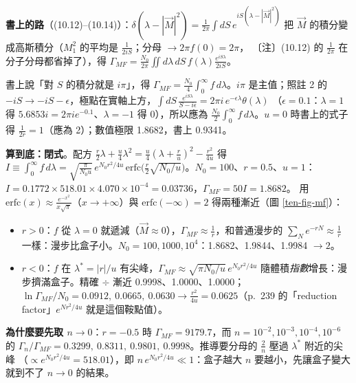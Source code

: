 \textbf{書上的路}（(10.12)--(10.14)）：$\delta(\lambda-|\vec M|^2)=\frac1{2\pi}\int dS\,e^{iS(\lambda-|\vec M|^2)}$ 把 $\vec M$ 的積分變成高斯積分（$M_1^2$ 的平均是 $\frac1{2iS}$；分母 $\to2\pi f(0)=2\pi$，
〔注〕(10.12) 的 $\frac1{2\pi}$ 在分子分母都省掉了），得 $\Gamma_{MF}=\frac{N_0}{2\pi}\iint d\lambda\,dS\,f(\lambda)\frac{e^{iS\lambda}}{2iS}$。
\begin{errbox}[p.~238，(10.14)$\to$(10.15)]
書上說「對 $S$ 的積分就是 $i\pi$」，得 $\Gamma_{MF}=\frac{N_0}4\int_0^\infty f\,d\lambda$。$i\pi$ 是主值；照註 2 的 $-iS\to-iS-\epsilon$，極點在實軸上方，$\int dS\,\frac{e^{iS\lambda}}{S-i\epsilon}=2\pi i\,e^{-\epsilon\lambda}\theta(\lambda)$
（$\epsilon=0.1$：$\lambda=1$ 得 $5.6853i=2\pi ie^{-0.1}$、$\lambda=-1$ 得 0），所以應為 $\frac{N_0}2\int_0^\infty f\,d\lambda$。$u=0$ 時書上的式子得 $\frac1{2r}=1$（應為 2）；數值極限 1.8682，書上 0.9341。
\end{errbox}

\textbf{算到底：閉式}。配方 $\frac r2\lambda+\frac u4\lambda^2=\frac u4(\lambda+\frac ru)^2-\frac{r^2}{4u}$ 得
$I\equiv\int_0^\infty f\,d\lambda=\sqrt{\frac\pi{N_0u}}\,e^{N_0r^2/4u}\,\mathrm{erfc}\big(\frac r2\sqrt{N_0/u}\big)$。$N_0=100$、$r=0.5$、$u=1$：$I=0.1772\times518.01\times4.070\times10^{-4}=0.03736$，$\Gamma_{MF}=50I=1.8682$。
用 $\mathrm{erfc}(x)\approx\frac{e^{-x^2}}{x\sqrt\pi}$（$x\to+\infty$）與 $\mathrm{erfc}(-\infty)=2$ 得兩種漸近（圖 \ref{ten-fig-mf}）：
\begin{itemize}[nosep]
\item $r>0$：$f$ 從 $\lambda=0$ 就遞減（$\vec M\approx0$），$\Gamma_{MF}\approx\frac1r$，和普通漫步的 $\sum_Ne^{-rN}\approx\frac1r$ 一樣：漫步比盒子小。$N_0=100,\allowbreak1000,\allowbreak10^4$：1.8682、1.9844、1.9984 $\to2$。
\item $r<0$：$f$ 在 $\lambda^*=|r|/u$ 有尖峰，$\Gamma_{MF}\approx\sqrt{\pi N_0/u}\,e^{N_0r^2/4u}$ 隨體積\emph{指數}增長：漫步擠滿盒子。精確 $\div$ 漸近 0.9998、1.0000、1.0000；
$\ln\Gamma_{MF}/N_0=0.0912,\allowbreak\ 0.0665,\allowbreak\ 0.0630\to\frac{r^2}{4u}=0.0625$（p.~239 的「reduction factor」$e^{Nr^2/4u}$ 就是這個鞍點值）。
\end{itemize}
\textbf{為什麼要先取 $n\to0$}：$r=-0.5$ 時 $\Gamma_{MF}=9179.7$，而 $n=10^{-2},\allowbreak10^{-3},\allowbreak10^{-4},\allowbreak10^{-6}$ 的 $\Gamma_n/\Gamma_{MF}=0.3299,\allowbreak\ 0.8311,\allowbreak\ 0.9801,\allowbreak\ 0.9998$。推導要分母的 $\frac2n$ 壓過 $\lambda^*$ 附近的尖峰
（$\propto e^{N_0r^2/4u}=518.01$），即 $n\,e^{N_0r^2/4u}\ll1$：盒子越大 $n$ 要越小，先讓盒子變大就到不了 $n\to0$ 的結果。

